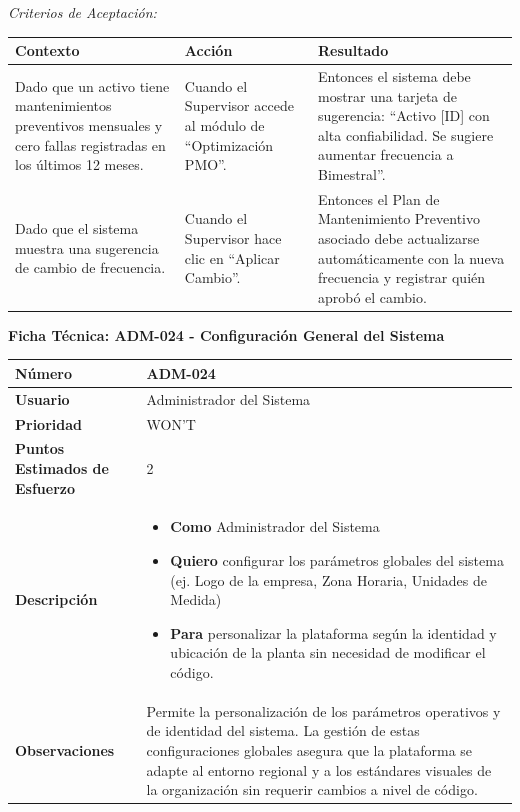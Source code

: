 \noindent\textit{Criterios de Aceptación:}
\footnotesize\begin{longtable}{|p{0.28\textwidth}|p{0.32\textwidth}|p{0.34\textwidth}|}\hline
\textbf{Contexto} & \textbf{Acción} & \textbf{Resultado} \\ \hline
\parbox[t]{\linewidth}{Dado que un activo tiene mantenimientos preventivos mensuales y cero fallas registradas en los últimos 12 meses.} & \parbox[t]{\linewidth}{Cuando el Supervisor accede al módulo de ``Optimización PMO''.} & \parbox[t]{\linewidth}{Entonces el sistema debe mostrar una tarjeta de sugerencia: ``Activo [ID] con alta confiabilidad. Se sugiere aumentar frecuencia a Bimestral''.} \\ \hline
\parbox[t]{\linewidth}{Dado que el sistema muestra una sugerencia de cambio de frecuencia.} & \parbox[t]{\linewidth}{Cuando el Supervisor hace clic en ``Aplicar Cambio''.} & \parbox[t]{\linewidth}{Entonces el Plan de Mantenimiento Preventivo asociado debe actualizarse automáticamente con la nueva frecuencia y registrar quién aprobó el cambio.} \\ \hline
\end{longtable}\normalsize
\vspace{1em}
\noindent\textbf{Ficha Técnica: ADM-024 - Configuración General del Sistema}
\footnotesize\setlength{\tabcolsep}{4pt}\renewcommand{\arraystretch}{1.2}
\begin{longtable}{|p{0.21\textwidth}|p{0.74\textwidth}|}\hline
\textbf{Número} & ADM-024 \\ \hline
\textbf{Usuario} & Administrador del Sistema \\ \hline
\textbf{Prioridad} & WON'T \\ \hline
\textbf{Puntos Estimados de Esfuerzo} & 2 \\ \hline
\textbf{Descripción} & \parbox[t]{\linewidth}{\vspace{2pt}\begin{itemize}[leftmargin=1.5em, nosep, topsep=0pt]
\item \textbf{Como} Administrador del Sistema
\item \textbf{Quiero} configurar los parámetros globales del sistema (ej. Logo de la empresa, Zona Horaria, Unidades de Medida)
\item \textbf{Para} personalizar la plataforma según la identidad y ubicación de la planta sin necesidad de modificar el código.
\end{itemize}\vspace{2pt}} \\ \hline
\textbf{Observaciones} & Permite la personalización de los parámetros operativos y de identidad del sistema. La gestión de estas configuraciones globales asegura que la plataforma se adapte al entorno regional y a los estándares visuales de la organización sin requerir cambios a nivel de código. \\ \hline
\end{longtable}\normalsize

